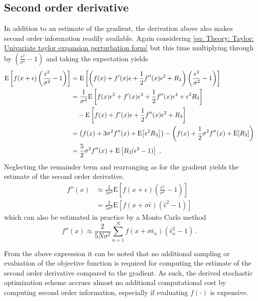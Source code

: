 \subsection{Second order derivative}\label{sec: Theory: Taylor: Second order derivative}
In addition to an estimate of the gradient, the derivation above also makes second order information readily available. 
Again considering \eqref{eq: Theory: Taylor: Univariate taylor expansion perturbation form} but this time multiplying through by $\left(\frac{\epsilon^2}{\sigma^2}-1\right)$ and taking the expectation yields
\begin{align*}
	\text{E}\left[f(x+\epsilon)\left(\frac{\epsilon^2}{\sigma^2} - 1\right)\right] 
	&= \text{E}\left[\left( f(x) + f'(x)\epsilon + \frac{1}{2}f''(x)\epsilon^2 + R_3\right)\left(\frac{\epsilon^2}{\sigma^2} - 1\right)\right]\\
	&= \frac{1}{\sigma^2}\text{E} \left[ f(x)\epsilon^2 + f'(x)\epsilon^3 + \frac{1}{2}f''(x)\epsilon^4 + \epsilon^2R_3\right] \\ 
	& \quad - \text{E} \left[ f(x) + f'(x)\epsilon + \frac{1}{2}f''(x)\epsilon^2 + R_3\right]\\
    &= {\left(f(x) + 3\sigma^2f''(x) + \text{E}{\left[\epsilon^2R_3\right]}\right)} - {\left(f(x) + \frac{1}{2}\sigma^2f''(x) + \text{E}{\left[R_3\right]}\right)}\\
	&= \frac{5}{2}\sigma^2f''(x) + \text{E}\left[R_3(\epsilon^2-1)\right] \ .
\end{align*}
Neglecting the remainder term and rearranging as for the gradient yields the estimate of the second order derivative.
\begin{align}
    f''(x) 
    &\approx \frac{2}{5\sigma^2}\text{E}\left[f(x+\epsilon)\left(\frac{\epsilon^2}{\sigma^2} - 1\right)\right]\label{eq: Theory: Taylor: Univariate hessian estimator}\\
    &= \frac{2}{5\sigma^2}\text{E}\left[f(x+\sigma\hat{\epsilon})\left(\hat{\epsilon}^2 - 1\right)\right]\label{eq: Theory: Taylor: Univariate hessian estimator from standard Gaussian}
\end{align}
which can also be estimated in practice by a Monto Carlo method
\begin{equation}
    f''(x) \approx \frac{2}{5N\sigma^2} \sum_{n=1}^N f(x+\sigma\hat{\epsilon}_n)\left(\hat{\epsilon}_n^2 - 1\right) \ .
\end{equation}

From the above expression it can be noted that no additional sampling or evaluation of the objective function is required for computing the estimate of the second order derivative compared to the gradient. As such, the derived stochastic optimization scheme accrues almost no additional computational cost by computing second order information, especially if evaluating $f(\cdot)$ is expensive.

